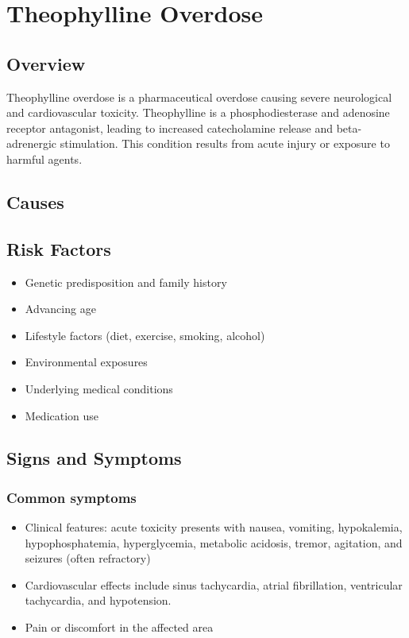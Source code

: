 \chapter{Theophylline Overdose}
\label{sec:Theophylline Overdose}

\section{Overview}
Theophylline overdose is a pharmaceutical overdose causing severe neurological and cardiovascular toxicity. Theophylline is a phosphodiesterase and adenosine receptor antagonist, leading to increased catecholamine release and beta-adrenergic stimulation. This condition results from acute injury or exposure to harmful agents.
\section{Causes}
\section{Risk Factors}

\begin{itemize}[noitemsep]
  \item Genetic predisposition and family history
  \item Advancing age
  \item Lifestyle factors (diet, exercise, smoking, alcohol)
  \item Environmental exposures
  \item Underlying medical conditions
  \item Medication use
\end{itemize}
\section{Signs and Symptoms}

\subsection{Common symptoms}
\begin{itemize}[noitemsep]
  \item Clinical features: acute toxicity presents with nausea, vomiting, hypokalemia, hypophosphatemia, hyperglycemia, metabolic acidosis, tremor, agitation, and seizures (often refractory)
  \item Cardiovascular effects include sinus tachycardia, atrial fibrillation, ventricular tachycardia, and hypotension.
  \item Pain or discomfort in the affected area
  \end{itemize}

